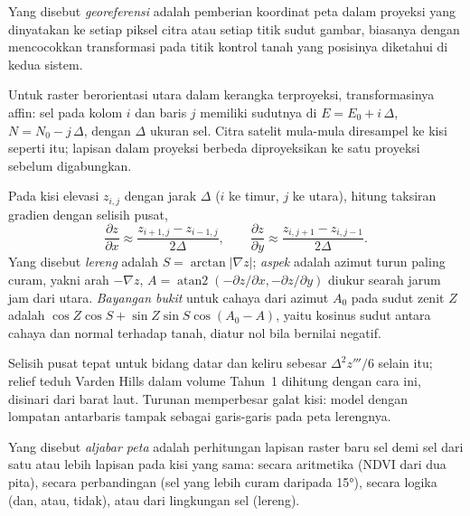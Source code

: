 \begin{definition}[Georeferensi]\label{def:b3:remote-sensing-gis:georef}
Yang disebut \emph{georeferensi} adalah pemberian koordinat peta
dalam proyeksi yang dinyatakan ke setiap piksel citra atau setiap
titik sudut gambar, biasanya dengan mencocokkan transformasi pada titik kontrol
tanah yang posisinya diketahui di kedua sistem.
\end{definition}

Untuk raster berorientasi utara dalam kerangka terproyeksi, transformasinya affin:
sel pada kolom $i$ dan baris $j$ memiliki sudutnya di $E = E_0 + i\,\Delta$,
$N = N_0 - j\,\Delta$, dengan $\Delta$ ukuran sel. Citra satelit mula-mula
diresampel ke kisi seperti itu; lapisan dalam proyeksi berbeda
diproyeksikan ke satu proyeksi sebelum digabungkan.

\begin{method}\label{met:b3:remote-sensing-gis:slope}
Pada kisi elevasi $z_{i,j}$ dengan jarak $\Delta$ ($i$ ke timur, $j$
ke utara), hitung taksiran gradien dengan selisih pusat,
\[
\frac{\partial z}{\partial x} \approx \frac{z_{i+1,j} - z_{i-1,j}}{2\Delta} ,
\qquad
\frac{\partial z}{\partial y} \approx \frac{z_{i,j+1} - z_{i,j-1}}{2\Delta} .
\]
Yang disebut \emph{lereng} adalah $S = \arctan|\nabla z|$; \emph{aspek} adalah
azimut turun paling curam, yakni arah $-\nabla z$, $A =
\operatorname{atan2}(-\partial z/\partial x, -\partial z/\partial y)$
diukur searah jarum jam dari utara. \emph{Bayangan bukit} untuk cahaya dari
azimut $A_0$ pada sudut zenit $Z$ adalah $\cos Z\cos S + \sin Z\sin S
\cos(A_0 - A)$, yaitu kosinus sudut antara cahaya dan normal
terhadap tanah, diatur nol bila bernilai negatif.
\end{method}

Selisih pusat tepat untuk bidang datar dan keliru sebesar
$\Delta^2 z'''/6$ selain itu; relief teduh Varden Hills dalam
volume Tahun~1 dihitung dengan cara ini, disinari dari barat laut.
Turunan memperbesar galat kisi: model dengan lompatan antarbaris tampak
sebagai garis-garis pada peta lerengnya.

\begin{definition}\label{def:b3:remote-sensing-gis:map-algebra}
Yang disebut \emph{aljabar peta} adalah perhitungan lapisan raster baru
sel demi sel dari satu atau lebih lapisan pada kisi yang sama: secara aritmetika
(NDVI dari dua pita), secara perbandingan (sel yang lebih curam daripada
\ang{15}), secara logika (dan, atau, tidak), atau dari lingkungan
sel (lereng).
\end{definition}

